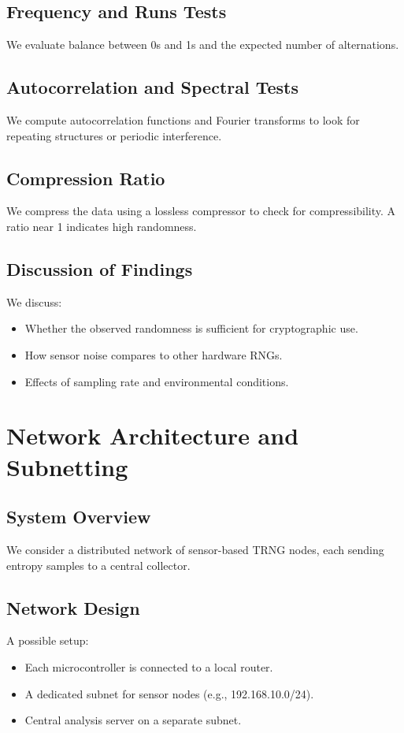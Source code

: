 \subsection{Frequency and Runs Tests}
We evaluate balance between 0s and 1s and the expected number of 
alternations. 

\subsection{Autocorrelation and Spectral Tests}
We compute autocorrelation functions and Fourier transforms to look 
for repeating structures or periodic interference.

\subsection{Compression Ratio}
We compress the data using a lossless compressor to check for 
compressibility. A ratio near 1 indicates high randomness.

\subsection{Discussion of Findings}
We discuss:
\begin{itemize}
    \item Whether the observed randomness is sufficient for 
        cryptographic use.
    \item How sensor noise compares to other hardware RNGs.
    \item Effects of sampling rate and environmental conditions.
\end{itemize}

\newpage
\section{Network Architecture and Subnetting}
\subsection{System Overview}
We consider a distributed network of sensor-based TRNG nodes, each 
sending entropy samples to a central collector.

\subsection{Network Design}
A possible setup:
\begin{itemize}
    \item Each microcontroller is connected to a local router.
    \item A dedicated subnet for sensor nodes (e.g., 192.168.10.0/24).
    \item Central analysis server on a separate subnet.
\end{itemize}

